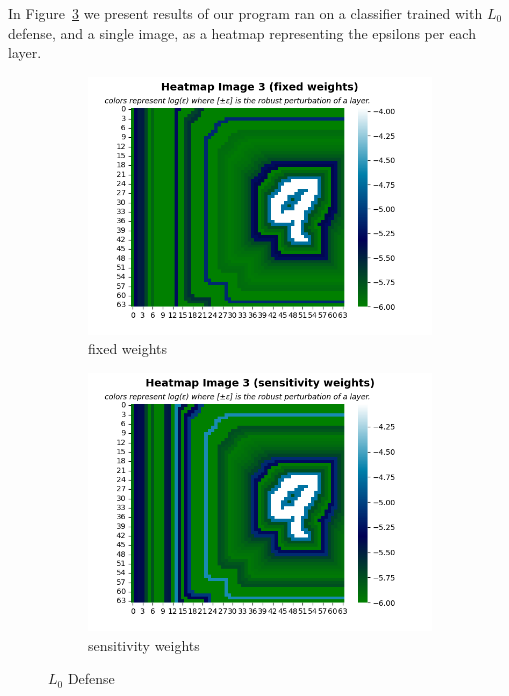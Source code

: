      In Figure~\ref{fig:L0 defense} we present results of our program ran on a classifier trained with $L_0$ defense, and a single image, as a heatmap representing the epsilons per each layer.
    \begin{figure}
         \centering
         \begin{subfigure}[b]{0.4\textwidth}
             \centering
             \includegraphics[width=\textwidth]{l0_defense_fixed_weights.png}
             \caption{fixed weights}
             \label{sub-fig:L0 defense FW}
         \end{subfigure}
         \hfill
         \begin{subfigure}[b]{0.4\textwidth}
             \centering
             \includegraphics[width=\textwidth]{l0_defense_sensitivity_weights.png}
             \caption{sensitivity weights}
             \label{sub-fig:L0 defense SW}
         \end{subfigure}
         \caption{$L_0$ Defense}
         \label{fig:L0 defense}
    \end{figure}